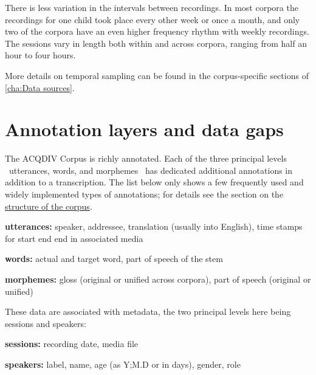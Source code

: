 \documentclass[a4paper, 11pt]{book}
\begin{document}
There is less variation in the intervals between recordings. In most corpora the recordings for one child took place every other week or once a month, and only two of the corpora have an even higher frequency rhythm with weekly recordings. The sessions vary in length both within and across corpora, ranging from half an hour to four hours. 

More details on temporal sampling can be found in the corpus-specific sections of \autoref{cha:Data sources}. 

\section{Annotation layers and data gaps}
\label{sec:Annotation layers and data gaps}

The ACQDIV Corpus is richly annotated. Each of the three principal levels \textendash\ utterances, words, and morphemes \textendash\ has dedicated additional annotations in addition to a transcription. The list below only shows a few frequently used and widely implemented types of annotations; for details see the section on the \hyperref[sec:Structure of the corpus]{structure of the corpus}. 

\begin{itemize*}
	\item \textbf{utterances:} speaker, addressee, translation (usually into English), time stamps for start end end in associated media
	\item \textbf{words:} actual and target word, part of speech of the stem
	\item \textbf{morphemes:} gloss (original or unified across corpora), part of speech (original or unified)
\end{itemize*}

These data are associated with metadata, the two principal levels here being sessions and speakers: 

\begin{itemize*}
	\item \textbf{sessions:} recording date, media file
	\item \textbf{speakers:} label, name, age (as Y;M.D or in days), gender, role
\end{itemize*}
\end{document}
